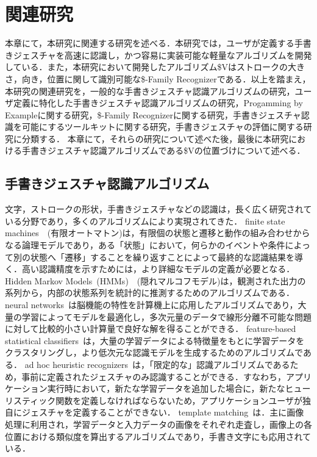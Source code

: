 \chapter{関連研究}
本章にて，本研究に関連する研究を述べる．本研究では，ユーザが定義する手書きジェスチャを高速に認識し，かつ容易に実装可能な軽量なアルゴリズムを開発している．また，本研究において開発したアルゴリズム\$Vはストロークの大きさ，向き，位置に関して識別可能な\$-Family Recognizerである．以上を踏まえ，本研究の関連研究を，一般的な手書きジェスチャ認識アルゴリズムの研究，ユーザ定義に特化した手書きジェスチャ認識アルゴリズムの研究，Progamming by Exampleに関する研究，\$-Family Recognizerに関する研究，手書きジェスチャ認識を可能にするツールキットに関する研究，手書きジェスチャの評価に関する研究に分類する．
本章にて，それらの研究について述べた後，最後に本研究における手書きジェスチャ認識アルゴリズムである\$Vの位置づけについて述べる．

\section{手書きジェスチャ認識アルゴリズム}
文字，ストロークの形状，手書きジェスチャなどの認識は，長く広く研究されている分野であり，多くのアルゴリズムにより実現されてきた．
finite state machines~\cite{Hong00constructingfinite}~(有限オートマトン)は，有限個の状態と遷移と動作の組み合わせからなる論理モデルであり，ある「状態」において，何らかのイベントや条件によって別の状態へ「遷移」することを繰り返すことによって最終的な認識結果を導く．高い認識精度を示すためには，より詳細なモデルの定義が必要となる．
Hidden Markov Models~(HMMs)~\cite{Anderson2004HiddenMM,Sezgin:2005:HES:1040830.1040899, Cao:2005:EOA:1089508.1089540}~(隠れマルコフモデル)は，観測された出力の系列から，内部の状態系列を統計的に推測するためのアルゴリズムである．
neural networks~\cite{Pittman:1991:RHT:108844.108914}は脳機能の特性を計算機上に応用したアルゴリズムであり，大量の学習によってモデルを最適化し，多次元量のデータで線形分離不可能な問題に対して比較的小さい計算量で良好な解を得ることができる．
feature-based statistical classifiers~\cite{Cho:2006:NGR:1711617.1711649,Rubine:1991:SGE:127719.122753}は，大量の学習データによる特徴量をもとに学習データをクラスタリングし，より低次元な認識モデルを生成するためのアルゴリズムである．
ad hoc heuristic recognizers~\cite{Anthony:2010:LMR:1839214.1839258, Wilson:2003:XUI:642611.642706}は，「限定的な」認識アルゴリズムであるため，事前に定義されたジェスチャのみ認識することができる．すなわち，アプリケーション実行時において，新たな学習データを追加した場合に，新たなヒューリスティック関数を定義しなければならないため，アプリケーションユーザが独自にジェスチャを定義することができない．
template matching~\cite{Kara:2005:ITS:1652319.1652712, Kristensson:2004:SLV:1029632.1029640}は．主に画像処理に利用され，学習データと入力データの画像をそれぞれ走査し，画像上の各位置における類似度を算出するアルゴリズムであり，手書き文字にも応用されている．

